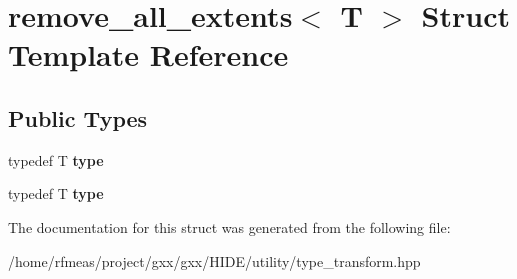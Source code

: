 \hypertarget{structremove__all__extents}{}\section{remove\+\_\+all\+\_\+extents$<$ T $>$ Struct Template Reference}
\label{structremove__all__extents}
\subsection*{Public Types}
\begin{DoxyCompactItemize}
\item 
typedef T {\bfseries type}\hypertarget{structremove__all__extents_a046817cb0915367d61b54fc14f865bf4}{}\label{structremove__all__extents_a046817cb0915367d61b54fc14f865bf4}

\item 
typedef T {\bfseries type}\hypertarget{structremove__all__extents_a046817cb0915367d61b54fc14f865bf4}{}\label{structremove__all__extents_a046817cb0915367d61b54fc14f865bf4}

\end{DoxyCompactItemize}


The documentation for this struct was generated from the following file\+:\begin{DoxyCompactItemize}
\item 
/home/rfmeas/project/gxx/gxx/\+H\+I\+D\+E/utility/type\+\_\+transform.\+hpp\end{DoxyCompactItemize}

